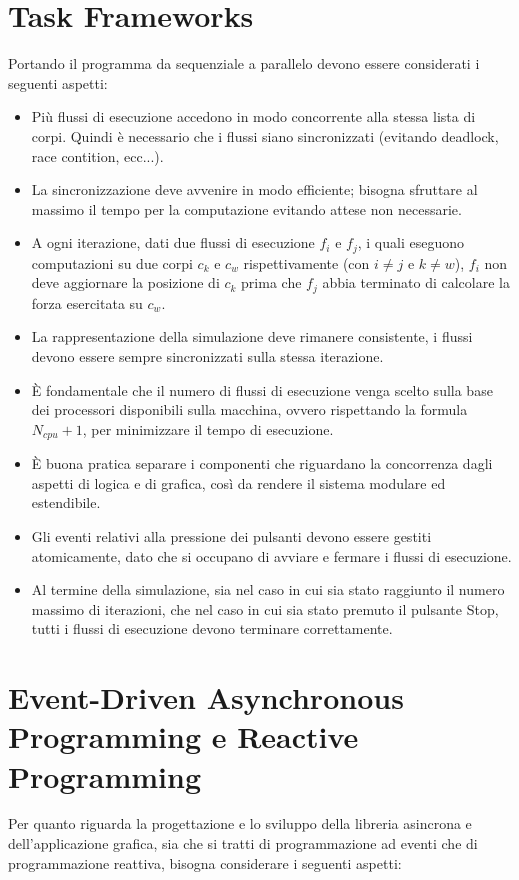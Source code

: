 \documentclass[12pt,a4paper,openright,twoside]{book}
\begin{document}
\section{Task Frameworks}
Portando il programma da sequenziale a parallelo devono essere considerati i seguenti aspetti:
\begin{itemize}
	\item Più flussi di esecuzione accedono in modo concorrente alla stessa lista di corpi.
	Quindi è necessario che i flussi siano sincronizzati (evitando deadlock, race contition, ecc...).
	\item La sincronizzazione deve avvenire in modo efficiente; bisogna sfruttare al massimo il tempo per
	la computazione evitando attese non necessarie.
	\item A ogni iterazione, dati due flussi di esecuzione $f_{i}$ e $f_{j}$, i quali eseguono computazioni su due corpi $c_{k}$ e $c_{w}$ rispettivamente (con $i \neq j$ e $k \neq w$),
	$f_{i}$ non deve aggiornare la posizione di $c_{k}$ prima che $f_{j}$ abbia terminato di calcolare la forza esercitata su $c_{w}$.
	\item La rappresentazione della simulazione deve rimanere
	consistente, i flussi devono essere sempre sincronizzati sulla
	stessa iterazione.
	\item È fondamentale che il numero di flussi di esecuzione venga scelto sulla base dei processori disponibili sulla macchina, ovvero
	rispettando la formula $N_{cpu} + 1$, per minimizzare il tempo di esecuzione.
	\item È buona pratica separare i componenti che riguardano la concorrenza dagli aspetti di logica e di grafica,
	così da rendere il sistema modulare ed estendibile.
	\item Gli eventi relativi alla pressione dei pulsanti
	devono essere gestiti atomicamente, dato che si occupano di
	avviare e fermare i flussi di esecuzione.
	\item Al termine della simulazione, sia nel caso in cui sia stato raggiunto
	il numero massimo di iterazioni, che nel caso in cui sia stato premuto il
	pulsante Stop, tutti i flussi di esecuzione devono terminare correttamente.
\end{itemize}

\section{Event-Driven Asynchronous Programming e Reactive Programming}
Per quanto riguarda la progettazione e lo sviluppo della libreria asincrona e dell'applicazione grafica, sia che si tratti di programmazione ad eventi che di programmazione reattiva, bisogna considerare i seguenti aspetti:
\end{document}
